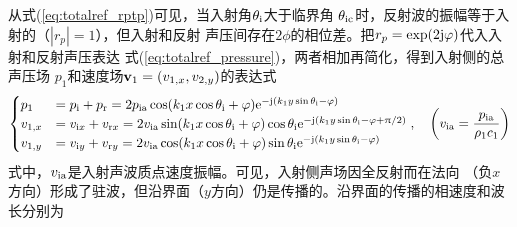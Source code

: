 \documentclass[UTF8]{ctexbook}
\begin{document}
从式(\ref{eq:totalref_rptp})可见，当入射角$\theta_\text{i}$大于临界角
$\theta_\text{ic}$时，反射波的振幅等于入射的（$|r_p|=1$），但入射和反射
声压间存在$2\phi$的相位差。把$r_p=\exp(2\mathrm{j} \varphi)$代入入射和反射声压表达
式(\ref{eq:totalref_pressure})，两者相加再简化，得到入射侧的总声压场
$p_1$和速度场$\vb{v}_1=(v_{1,x}, v_{2,y})$的表达式
\begin{equation}
	\begin{cases}
		p_1&= p\st{i}+p\st{r} = 2p\st{ia}\cos(k_1x\cos\theta\st{i}+\phi)
		\me^{-\mj (k_1y\sin\theta\st{i}-\phi)}\\
		v_{1,x}&= v_{\mi x} + v_{\mathrm{r}x} = 2v\st{ia}\sin
		(k_1x\cos\theta\st{i}+\phi)\cos\theta\st{i}
		\me^{-\mj \qty(k_1y\sin\theta\st{i}-\phi+ \uppi/2)}\\
		v_{1,y}&= v_{\mi y} + v_{\mathrm{r}y} = 2v\st{ia}\cos
		(k_1x\cos\theta\st{i}+\phi)\sin\theta\st{i}
		\me^{-\mj \qty(k_1y\sin\theta\st{i}-\phi)}
	\end{cases}
	\qc \qty(v\st{ia} = \frac{p\st{ia}}{\rho_1c_1})
\end{equation}
式中，$v_\text{ia}$是入射声波质点速度振幅。可见，入射侧声场因全反射而在法向
（负$x$方向）形成了驻波，但沿界面（$y$方向）仍是传播的。沿界面的传播的相速度和波长分别为
 
\end{document}
